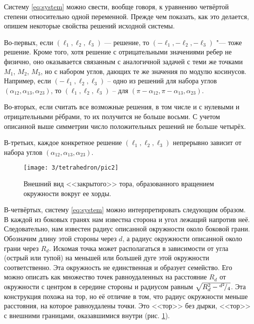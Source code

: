 \documentclass[../main.tex]{subfiles}
\begin{document}
Систему \eqref{eq:system} можно свести, вообще говоря, к уравнению четвёртой степени относительно одной переменной. Прежде чем показать, как это делается, опишем некоторые свойства решений исходной системы.

Во-первых, если $\left(\ell_1, \ell_2, \ell_3\right)$ --- решение, то $\left(-\ell_1, -\ell_2, -\ell_3\right)$ "--- тоже решение.  Кроме того, хотя решение с отрицательными значениями ребер не физично, оно  оказывается связанным с аналогичной задачей с теми же точками $M_1$, $M_2$, $M_3$, но с набором углов, дающих те же значения по модулю косинусов. Например, если $\left(-\ell_1, \ell_2, \ell_3\right)$ -- одно из решений для набора углов $\left(\alpha_{12}, \alpha_{13}, \alpha_{23}\right)$, то $\left(\ell_1, \ell_2, \ell_3\right)$ -- для $\left(\pi-\alpha_{12}, \pi-\alpha_{13}, \alpha_{23}\right)$.

Во-вторых, если считать все возможные решения, в том числе и с нулевыми и отрицательными рёбрами, то их получится не больше восьми. С учетом описанной выше симметрии число положительных решений не больше четырёх.

В-третьих, каждое конкретное решение $\left(\ell_1, \ell_2, \ell_3\right)$ непрерывно зависит от набора углов $\left(\alpha_{12}, \alpha_{13}, \alpha_{23}\right)$.

\begin{figure}[hbp]
  \centering

  \texttt{[image: 3/tetrahedron/pic2]}

  \caption{Внешний вид <<закрытого>> тора, образованного вращением окружности вокруг ее хорды.}
  \label{fig:tetrahedron:pic2}
\end{figure}

В-четвёртых, систему \eqref{eq:system} можно интерпретировать следующим образом. В каждой из боковых гранях нам известна сторона и угол лежащий напротив неё. Следовательно, нам известен радиус описанной окружности около боковой грани. Обозначим длину этой стороны через $d$, а радиус окружности описанной около грани через $R_d$. Искомая точка может располагаться в  зависимости от угла (острый или тупой)  на меньшей или большей дуге этой окружности соответственно. Эта окружность не единственная и образует семейство. Его можно описать как множество точек равноудаленных на расстояние $R_d$ от окружности с центром в середине стороны и радиусом равным $\sqrt{R_d^2 - {}^{d^2}\!/_{4}}$. Эта конструкция похожа на тор, но её отличие в том, что  радиус окружности меньше расстояния, на которое равноудалены точки. Это <<тор>> без дырки, <<тор>> с внешними границами, оказавшимися внутри (рис. \ref{fig:tetrahedron:pic2}).
\end{document}
